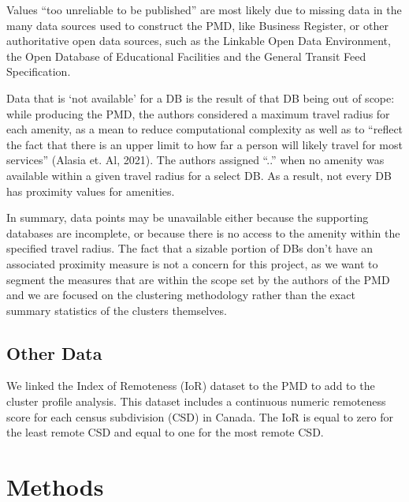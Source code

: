 \documentclass[11pt, a4paper]{article}
\begin{document}
Values ``too unreliable to be published'' are most likely due to missing data in the many data sources used to construct the PMD, like Business Register, or other authoritative open data sources, such as the Linkable Open Data Environment, the Open Database of Educational Facilities and the General Transit Feed Specification.
\par
Data that is `not available' for a DB is the result of that DB being out of scope: while producing the PMD, the authors considered a maximum travel radius for each amenity, as a mean to reduce computational complexity as well as to ``reflect the fact that there is an upper limit to how far a person will likely travel for most services'' (Alasia et. Al, 2021). The authors assigned ``..'' when no amenity was available within a given travel radius for a select DB. As a result, not every DB has proximity values for amenities.
\par
In summary, data points may be unavailable either because the supporting databases are incomplete, or because there is no access to the amenity within the specified travel radius. The fact that a sizable portion of DBs don’t have an associated proximity measure is not a concern for this project, as we want to segment the measures that are within the scope set by the authors of the PMD and we are focused on the clustering methodology rather than the exact summary statistics of the clusters themselves.








\subsection{Other Data}


We linked the Index of Remoteness (IoR) dataset to the PMD to add to the cluster profile analysis. This dataset includes a continuous numeric remoteness score for each census subdivision (CSD) in Canada. The IoR is equal to zero for the least remote CSD and equal to one for the most remote CSD.









\pagebreak
\section{Methods}
\end{document}
